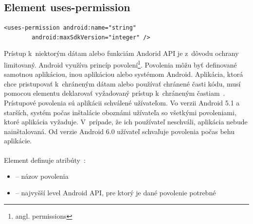 \subsection{Element uses-permission}
\label{el_uses-permission}
\lstset{language=XML}
\begin{lstlisting}
<uses-permission android:name="string"
        android:maxSdkVersion="integer" />
\end{lstlisting}
Prístup k~niektorým dátam alebo funkciám Andorid API je z~dôvodu ochrany limitovaný. Android využíva princíp povolení\footnote{angl. permissions}. Povolenia môžu byť definované samotnou aplikáciou, inou aplikáciou alebo systémom Android. Aplikácia, ktorá chce pristupovať k~chráneným dátam alebo používať chránené časti kódu, musí pomocou elementu  deklarovať vyžadovaný prístup k~chráneným častiam~\cite{appManifest}. Prístupové povolenia sú aplikácii schválené užívateľom. Vo verzii Android 5.1 a starších, systém počas inštalácie oboznámi užívateľa so všetkými povoleniami, ktoré aplikácia vyžaduje. V~prípade, že ich používateľ neschváli, aplikácia nebude nainštalovaná. Od verzie Android 6.0 užívateľ schvaľuje povolenia počas behu aplikácie.\\\\ 
Element  definuje atribúty~\cite{elUsesPerm}:\\
\begin{itemize}
\item {} -- názov povolenia
\item {} -- najvyšší level Android API, pre ktorý je dané povolenie potrebné
\end{itemize}

